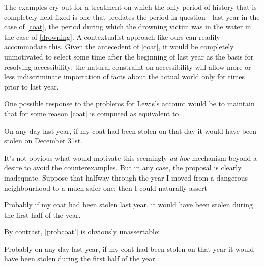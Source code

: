\documentclass[If.tex]{subfiles}
\begin{document}
The examples cry out for a treatment on which the only period of history that is completely held fixed is one that predates the period in question---last year in the case of \ref{coat}, the period during which the drowning victim was in the water in the case of \ref{drowning}. A contextualist approach like ours can readily accommodate this. Given the antecedent of \ref{coat}, it would be completely unmotivated to select some time after the beginning of last year as the basis for resolving accessibility: the natural constraint on accessibility will allow more or less indiscriminate importation of facts about the actual world only for times prior to last year.

One possible response to the problems for Lewis's account would be to maintain that for some reason \ref{coat} is computed as equivalent to
\begin{prop}
	On any day last year, if my coat had been stolen on that day it would have been stolen on December 31st. 
\end{prop}
It's not obvious what would motivate this seemingly \emph{ad hoc} mechanism beyond a desire to avoid the counterexamples. But in any case, the proposal is clearly inadequate. Suppose that halfway through the year I moved from a dangerous neighbourhood to a much safer one; then I could naturally assert
\begin{prop}
	\nitem \label{probcoat}
		Probably if my coat had been stolen last year, it would have been stolen during the first half of the year.
\end{prop}
By contrast, \ref{probcoat'} is obviously unassertable:
\begin{prop}
	 \label{probcoat'} 
	Probably on any day last year, if my coat had been stolen on that year it would have been stolen during the first half of the year.
\end{prop}
\end{document}
